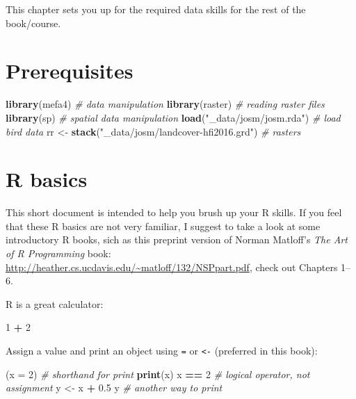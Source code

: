 \documentclass[12pt,]{book}
\newenvironment{Shaded}{\begin{snugshade}}{\end{snugshade}}
\newcommand{\CommentTok}[1]{\textcolor[rgb]{0.56,0.35,0.01}{\textit{#1}}}
\newcommand{\DataTypeTok}[1]{\textcolor[rgb]{0.13,0.29,0.53}{#1}}
\newcommand{\DecValTok}[1]{\textcolor[rgb]{0.00,0.00,0.81}{#1}}
\newcommand{\FloatTok}[1]{\textcolor[rgb]{0.00,0.00,0.81}{#1}}
\newcommand{\KeywordTok}[1]{\textcolor[rgb]{0.13,0.29,0.53}{\textbf{#1}}}
\newcommand{\NormalTok}[1]{#1}
\newcommand{\OperatorTok}[1]{\textcolor[rgb]{0.81,0.36,0.00}{\textbf{#1}}}
\newcommand{\StringTok}[1]{\textcolor[rgb]{0.31,0.60,0.02}{#1}}
\begin{document}
This chapter sets you up for the required data skills for the
rest of the book/course.

\hypertarget{prerequisites}{%
\section{Prerequisites}\label{prerequisites}}

\begin{Shaded}
\begin{Highlighting}[]
\KeywordTok{library}\NormalTok{(mefa4)                }\CommentTok{# data manipulation}
\KeywordTok{library}\NormalTok{(raster)               }\CommentTok{# reading raster files}
\KeywordTok{library}\NormalTok{(sp)                   }\CommentTok{# spatial data manipulation}
\KeywordTok{load}\NormalTok{(}\StringTok{"_data/josm/josm.rda"}\NormalTok{)   }\CommentTok{# load bird data}
\NormalTok{rr <-}\StringTok{ }\KeywordTok{stack}\NormalTok{(}\StringTok{"_data/josm/landcover-hfi2016.grd"}\NormalTok{) }\CommentTok{# rasters}
\end{Highlighting}
\end{Shaded}

\hypertarget{rbasics}{%
\section{R basics}\label{rbasics}}

This short document is intended to help you brush up your R skills.
If you feel that these R basics are not very familiar,
I suggest to take a look at some introductory R books,
sich as this preprint version of Norman Matloff's \emph{The Art of R Programming} book: \url{http://heather.cs.ucdavis.edu/~matloff/132/NSPpart.pdf}, check out Chapters 1--6.

R is a great calculator:

\begin{Shaded}
\begin{Highlighting}[]
\DecValTok{1} \OperatorTok{+}\StringTok{ }\DecValTok{2}
\end{Highlighting}
\end{Shaded}

Assign a value and print an object using \texttt{=} or \texttt{\textless{}-} (preferred in this book):

\begin{Shaded}
\begin{Highlighting}[]
\NormalTok{(}\DataTypeTok{x =} \DecValTok{2}\NormalTok{) }\CommentTok{# shorthand for print}
\KeywordTok{print}\NormalTok{(x)}
\NormalTok{x }\OperatorTok{==}\StringTok{ }\DecValTok{2} \CommentTok{# logical operator, not assignment}
\NormalTok{y <-}\StringTok{ }\NormalTok{x }\OperatorTok{+}\StringTok{ }\FloatTok{0.5}
\NormalTok{y }\CommentTok{# another way to print}
\end{Highlighting}
\end{Shaded}
\end{document}
